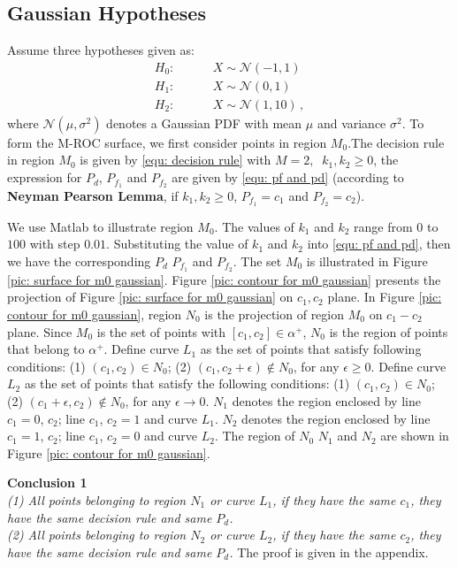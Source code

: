 \documentclass[12pt,journal,a4paper,twoside,onecolumn,draft]{IEEEtran}
\begin{document}
\begin{spacing}{2.5}
\subsection{Gaussian Hypotheses}
Assume three hypotheses given as:
\begin{equation}
\label{equ: Gaussian Hypothesis}
\begin{split}
	H_0:\;\;\;\;\;\;\;\;&X \sim \mathcal{N}(-1,1)\\
    H_1:\;\;\;\;\;\;\;\;&X \sim \mathcal{N}(0,1)\\
    H_2:\;\;\;\;\;\;\;\;&X \sim \mathcal{N}(1,10)\,,
\end{split}
\end{equation}
where $\mathcal{N}(\mu,\sigma^2)$ denotes a Gaussian PDF with mean $\mu$ and variance $\sigma^2$.
To form the M-ROC surface, we first consider points in region $M_0$.The decision rule in region $M_0$ is given by \eqref{equ: decision rule}
with $M=2,\;\;k_1, k_2 \geq 0$, the expression for $P_d$, $P_{f_1}$ and $P_{f_2}$ are given by \eqref{equ: pf and pd} (according to \textbf{Neyman Pearson Lemma}, if $k_1, k_2 \geq 0$, $P_{f_1} = c_1$ and $P_{f_2} = c_2$).

We use Matlab to illustrate region $M_0$. The values of $k_1$ and $k_2$ range from $0$ to $100$ with step $0.01$. Substituting the value of $k_1$ and $k_2$ into \eqref{equ: pf and pd}, then we have the corresponding $P_d$ $P_{f_1}$ and $P_{f_2}$.  The set $M_0$ is illustrated in Figure \ref{pic: surface for m0 gaussian}. Figure \ref{pic: contour for m0 gaussian} presents the projection of Figure \ref{pic: surface for m0 gaussian} on $c_1, c_2$ plane.
In Figure \ref{pic: contour for m0 gaussian}, region $N_0$ is the projection of region $M_0$ on $c_1 - c_2$ plane. Since $M_0$ is the set of points with $[c_1, c_2] \in \alpha^+$, $N_0$ is the region of points that belong to $\alpha^+$.
Define curve $L_1$ as the set of points that satisfy following conditions: (1) $(c_1, c_2) \in N_0$; (2) $(c_1, c_2+\epsilon) \notin N_0$, for any $\epsilon \geq 0$. Define curve $L_2$ as the set of points that satisfy the following conditions: (1) $(c_1, c_2) \in N_0$; (2) $(c_1 + \epsilon, c_2) \notin N_0$, for any $\epsilon \rightarrow 0$.
$N_1$ denotes the region enclosed by line $c_1 = 0$, $c_2$; line $c_1$, $c_2 = 1$ and curve $L_1$.
$N_2$ denotes the region enclosed by line $c_1 = 1$, $c_2$; line $c_1$, $c_2 = 0$ and curve $L_2$.
The region of $N_0$ $N_1$ and $N_2$ are shown in Figure \ref{pic: contour for m0 gaussian}.

\textbf{Conclusion 1}
\textit{\\(1) All points belonging to region $N_1$ or curve $L_1$, if they have the same $c_1$, they have the same decision rule and same $P_d$.
\\(2) All points belonging to region $N_2$ or curve $L_2$, if they have the same $c_2$, they have the same decision rule and same $P_d$.
}
The proof is given in the appendix.



\end{spacing}
\end{document}
